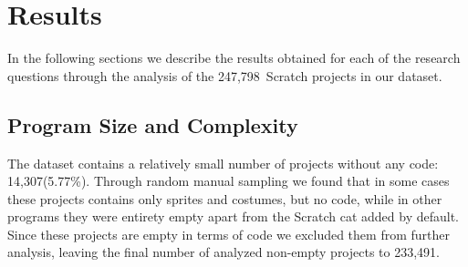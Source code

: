 \documentclass{sig-alternate}
\newcommand{\nAnalyzedPrograms}{247,798}
\newcommand{\nemptyPrograms}{14,307}
\newcommand{\nScriptPrograms}{233,491}
\begin{document}
\section{Results}
\label{sec:results}
In the following sections we describe the results obtained for each of the research questions through the analysis of the \nAnalyzedPrograms~Scratch projects in our dataset.

\subsection{Program Size and Complexity}

The dataset contains a relatively small number of projects without any code: \nemptyPrograms (5.77\%). Through random manual sampling we found that in some cases these projects contains only sprites and costumes, but no code, while in other programs they were entirety empty apart from the Scratch cat added by default. Since these projects are empty in terms of code we excluded them from further analysis, leaving the final number of analyzed non-empty projects to \nScriptPrograms.
\end{document}
